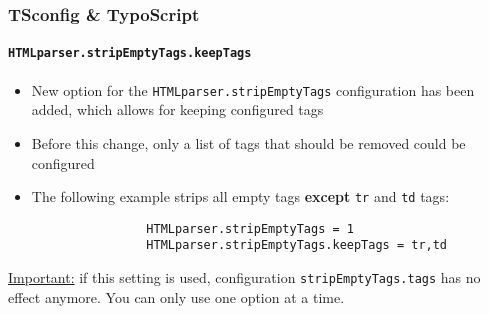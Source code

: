 \begin{frame}[fragile]
	\frametitle{TSconfig \& TypoScript}
	\framesubtitle{\texttt{HTMLparser.stripEmptyTags.keepTags}}

	\lstset{basicstyle=\tiny\ttfamily}

	\begin{itemize}

		\item New option for the \texttt{HTMLparser.stripEmptyTags} configuration has been added,
			which allows for keeping configured tags

		\item Before this change, only a list of tags that should be removed could be configured

		\item The following example strips all empty tags \textbf{except} \texttt{tr} and
			\texttt{td} tags:

			\begin{lstlisting}
				HTMLparser.stripEmptyTags = 1
				HTMLparser.stripEmptyTags.keepTags = tr,td
			\end{lstlisting}

	\end{itemize}

	\underline{Important:} if this setting is used, configuration \texttt{stripEmptyTags.tags}
		has no effect anymore. You can only use one option at a time.

\end{frame}

